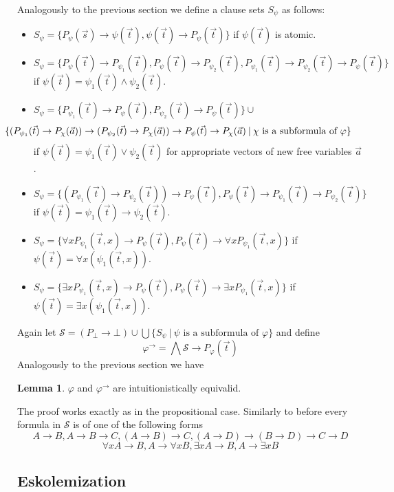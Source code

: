 \documentclass[a4paper,12pt]{report}
\theoremstyle{definition}
\theoremstyle{definition}
\theoremstyle{definition}
\newtheorem{lemma}[theorem]{Lemma}
\theoremstyle{definition}
\theoremstyle{definition}
\theoremstyle{definition}
\theoremstyle{definition}
\begin{document}
	Analogously to the previous section we define a clause sets $S_\psi$ as follows:
	\begin{itemize}
		\item $S_\psi = \{P_\psi(\vec s)\to\psi(\vec t), \psi(\vec t)\to P_\psi(\vec t)\}$ if $\psi(\vec t)$ is atomic.
		\item $S_\psi = \{P_\psi(\vec t)\to P_{\psi_1}(\vec t), P_\psi(\vec t)\to P_{\psi_2}(\vec t),P_{\psi_1}(\vec t)\to P_{\psi_2}(\vec t)\to P_\psi(\vec t)\}$ if $\psi(\vec t) = \psi_1(\vec t)\wedge\psi_2(\vec t)$.
		\item $S_\psi = \{P_{\psi_1}(\vec t)\to P_\psi(\vec t), P_{\psi_2}(\vec t)\to P_\psi(\vec t)\}\cup $ $$\hspace{-1.5cm}\{(P_{\psi_1}(\vec t)\to P_\chi(\vec a))\to (P_{\psi_2}(\vec t)\to P_\chi(\vec a))\to P_\psi(\vec t)\to P_\chi(\vec a)\:|\:\chi \text{ is a subformula of $\varphi$}\}$$ if $\psi(\vec t) = \psi_1(\vec t)\vee\psi_2(\vec t)$ for appropriate vectors of new free variables $\vec a$.
		\item $S_\psi = \{(P_{\psi_1}(\vec t)\to P_{\psi_2}(\vec t))\to P_\psi(\vec t), P_\psi(\vec t)\to P_{\psi_1}(\vec t)\to P_{\psi_2}(\vec t)\}$ if $\psi(\vec t) = \psi_1(\vec t)\to\psi_2(\vec t)$.
		\item $S_\psi = \{\forall xP_{\psi_1}(\vec t, x) \to P_\psi(\vec t), P_\psi(\vec t)\to \forall xP_{\psi_1}(\vec t, x)\}$ if $\psi(\vec t) = \forall x(\psi_1(\vec t, x))$.
		\item $S_\psi = \{\exists xP_{\psi_1}(\vec t, x) \to P_\psi(\vec t), P_\psi(\vec t)\to \exists xP_{\psi_1}(\vec t, x)\}$ if $\psi(\vec t) = \exists x(\psi_1(\vec t, x))$.
	\end{itemize}
	Again let $\mathcal S = (P_\bot \to\bot)\cup\bigcup\{S_\psi\:|\:\psi\text{ is a subformula of $\varphi$}\}$ and define
	$$\varphi^\to = \bigwedge{\mathcal S} \to P_\varphi(\vec t)$$
	Analogously to the previous section we have
	\begin{lemma}
		$\varphi$ and $\varphi^\to$ are intuitionistically equivalid.
	\end{lemma}
	The proof works exactly as in the propositional case. Similarly to before every formula in $\mathcal S$ is of one of the following forms $$A\to B, A\to B\to C, (A\to B)\to C, (A\to D)\to(B\to D)\to C\to D$$$$\forall xA\to B, A\to\forall xB, \exists xA\to B, A\to\exists xB$$
	
	\subsection{Eskolemization}
	
\end{document}
